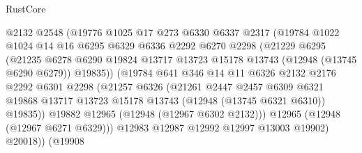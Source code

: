 \begin{lexlean}{RustCore}
\begin{coremodule}
                        @2132
                        @2548
                        (@19776
                          @1025
                          @17
                          @273
                          @6330
                          @6337
                          @2317
                          (@19784
                            @1022
                            @1024
                            @14
                            @16
                            @6295
                            @6329
                            @6336
                            @2292
                            @6270
                            @2298
                            (@21229
                              @6295
                              (@21235
                                @6278
                                @6290
                                @19824
                                @13717
                                @13723
                                @15178
                                @13743
                                (@12948 (@13745 @6290 @6279))
                                @19835))
                            (@19784
                              @641
                              @346
                              @14
                              @11
                              @6326
                              @2132
                              @2176
                              @2292
                              @6301
                              @2298
                              (@21257
                                @6326
                                (@21261
                                  @2447
                                  @2457
                                  @6309
                                  @6321
                                  @19868
                                  @13717
                                  @13723
                                  @15178
                                  @13743
                                  (@12948 (@13745 @6321 @6310))
                                  @19835))
                              @19882
                              @12965
                              (@12948 (@12967 @6302 @2132)))
                            @12965
                            (@12948 (@12967 @6271 @6329)))
                          @12983
                          @12987
                          @12992
                          @12997
                          @13003
                          @19902)
                        @20018))
                    (@19908

\end{coremodule}
\end{lexlean}
